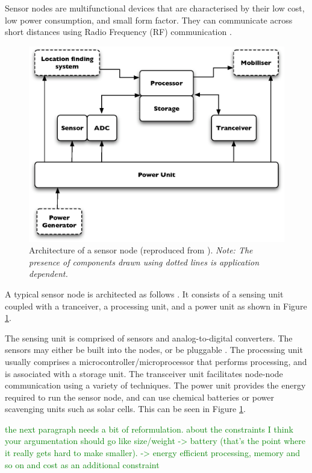 Sensor nodes are multifunctional devices that are characterised by their low 
cost, low power consumption, and small form factor. They can communicate across 
short distances using Radio Frequency (RF) communication 
\cite{SensorSurveyAkyildiz:2002}.

\begin{figure}[h] \centering
\label{Fig:SensorNodeArch}
\includegraphics[scale=0.55]{img/SensorNodeArch.eps} \caption[Architecture of a 
sensor node] {Architecture of a sensor node (reproduced from
\cite{SensorSurveyAkyildiz:2002}). \emph{Note: The presence of components drawn using dotted lines is application dependent.}}
\end{figure} 

A typical sensor node is architected as follows 
\cite{SensorSurveyAkyildiz:2002}. It consists of a sensing unit coupled with a
tranceiver, a processing unit, and a power unit as shown in
Figure \ref{Fig:SensorNodeArch}.

The sensing unit is comprised of sensors and analog-to-digital converters. 
The sensors may either be built into the nodes, or be pluggable 
\cite{MANETWarrier:2007}. The processing unit usually comprises a 
microcontroller/microprocessor that performs processing, and is associated with 
a storage unit. The transceiver unit facilitates node-node communication using 
a variety of techniques. The power 
unit provides the energy required to run the sensor node, and can use chemical 
batteries or power scavenging units such as solar cells. This can be seen in 
Figure \ref{Fig:SensorNodeArch}.

\textcolor{green}{the next paragraph needs a bit of reformulation. about the constraints
I think your argumentation should go like size/weight -> battery  (that's the
point where it really gets hard to make smaller). -> energy efficient processing, memory and so on
and cost as an additional constraint }

